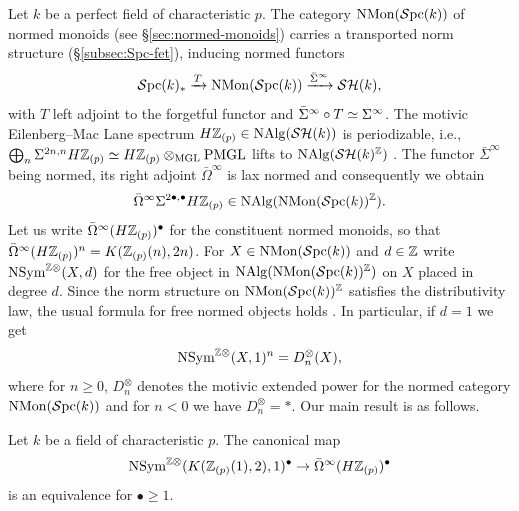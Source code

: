 \documentclass{amsart}
\renewcommand{\NB}[1]{}
\numberwithin{proposition}{section}
\numberwithin{equation}{section}
\def\NSym{\mathrm{NSym}}
\def\NMon{\mathrm{NMon}}
\begin{document}
Let $k$ be a perfect field of characteristic $p$.
The category $\NMon(\Spc(k))$ of normed monoids (see \S\ref{sec:normed-monoids}) carries a transported norm structure (\S\ref{subsec:Spc-fet}), inducing normed functors \[ \Spc(k)_* \xrightarrow{T} \NMon(\Spc(k)) \xrightarrow{\bar\Sigma^\infty} \SH(k), \] with $T$ left adjoint to the forgetful functor and $\bar\Sigma^\infty \circ T \simeq \Sigma^\infty$.
The motivic Eilenberg--Mac Lane spectrum $H\mathbb{Z}_{(p)} \in \mathrm{NAlg}(\mathcal{SH}(k))$ is periodizable, i.e., $\bigoplus_n \Sigma^{2n,n}H\mathbb{Z}_{(p)} \simeq H\mathbb{Z}_{(p)} \otimes_{\mathrm{MGL}} \mathrm{PMGL}$ lifts to $\mathrm{NAlg}(\mathcal{SH}(k)^{\mathbb{Z}})$ \cite[Example~16.34]{bachmann-norms}.
The functor $\bar\Sigma^\infty$ being normed, its right adjoint $\bar\Omega^\infty$ is lax normed and consequently we obtain \[ \bar\Omega^\infty \Sigma^{2\bullet,\bullet} H\Z_{(p)} \in \NAlg(\NMon(\Spc(k))^\Z). \]
Let us write $\bar\Omega^\infty(H\mathbb{Z}_{(p)})^\bullet$ for the constituent normed monoids, so that $\bar\Omega^\infty(H\mathbb{Z}_{(p)})^n = K(\mathbb{Z}_{(p)}(n),2n)$.
For $X \in \NMon(\Spc(k))$ and $d \in \mathbb{Z}$ write $\NSym^{\Z\otimes}(X,d)$ for the free object in $\NAlg(\NMon(\Spc(k))^\Z)$ on $X$ placed in degree $d$.
Since the norm structure on $\NMon(\Spc(k))^\Z$ satisfies the distributivity law, the usual formula for free normed objects holds \cite[Example~13.19]{bachmann-norms}.
In particular, if $d=1$ we get \[ \NSym^{\Z\otimes}(X,1)^n = D_n^\otimes(X), \] where for $n \ge 0$, $D_n^\otimes$ denotes the motivic extended power \cite[Definition~5.6]{bachmann-colimits} for the normed category $\NMon(\Spc(k))$ and for $n<0$ we have $D_n^\otimes = *$.
Our main result is as follows.
\begin{theorem} \label{thm:intro-main}
Let $k$ be a field of characteristic $p$.
The canonical map \[ \NSym^{\Z\otimes}(K(\Z_{(p)}(1),2),1)^\bullet \to \bar\Omega^\infty(H\Z_{(p)})^\bullet \] is an equivalence for $\bullet \ge 1$.\NB{what about $\bullet=0$?}
\end{theorem}
\end{document}
